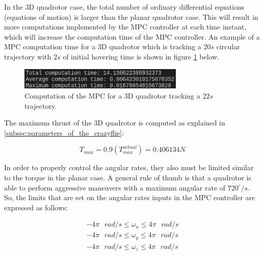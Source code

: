 \documentclass{thesisreport}
\begin{document}
In the 3D quadrotor case, the total number of ordinary differential equations (equations of motion) is larger than the planar quadrotor case. This will result in more computations implemented by the MPC controller at each time instant, which will increase the computation time of the MPC controller. An example of a MPC computation time for a 3D quadrotor which is tracking a $20s$ circular trajectory with $2s$ of initial hovering time is shown in figure \ref{fig:computation_time_3D_quadrotor} below.

\begin{figure}[h]
	\centering
	\includegraphics[width=0.7\textwidth]{Images/acados_simulations/circular_trajectory/3D_quadrotor/computation_time.png}
	\caption{Computation of the MPC for a 3D quadrotor tracking a $22s$ trajectory.}
	\label{fig:computation_time_3D_quadrotor}
\end{figure}

The maximum thrust of the 3D quadrotor is computed as explained in \ref{subsec:parameters_of_the_crazyflie}: 

	\begin{equation}
		T_{max} = 0.9 (T_{max}^{actual})=0.406134N
	\end{equation}

In order to properly control the angular rates, they also must be limited similar to the torque in the planar case. A general rule of thumb is that a quadrotor is able to perform aggressive maneuvers with a maximum angular rate of $720^{\circ}/s$. So, the limits that are set on the angular rates inputs in the MPC controller are expressed as follows:

		\begin{align}
			-4 \pi \text{ }rad/s \leq \omega_x \leq 4 \pi \text{ } rad/s \\
			-4 \pi \text{ }rad/s \leq \omega_y \leq 4 \pi \text{ } rad/s \\
			-4 \pi \text{ }rad/s \leq \omega_z \leq 4 \pi \text{ } rad/s
		\end{align}

\newpage
\end{document}
